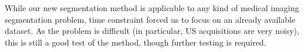 While our new segmentation method is applicable to any kind of medical imaging segmentation problem, time constraint forced us to focus on an already available dataset. As the problem is difficult (in particular, US acquisitions are very noisy), this is still a good test of the method, though further testing is required. 


        
        
